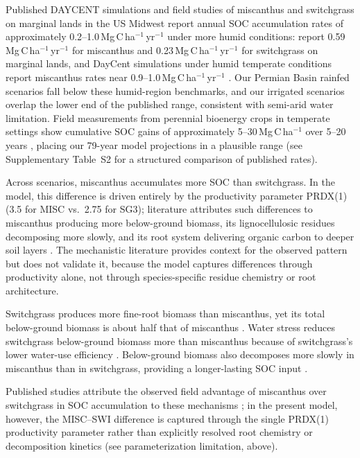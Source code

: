 \documentclass[11pt]{article}
\begin{document}
Published DAYCENT simulations and field studies of miscanthus and switchgrass on marginal lands in the US Midwest report annual SOC accumulation rates of approximately 0.2--1.0\,Mg\,C\,ha$^{-1}$\,yr$^{-1}$ under more humid conditions: \citet{Gelfand2013MarginalLands} report 0.59\,Mg\,C\,ha$^{-1}$\,yr$^{-1}$ for miscanthus and 0.23\,Mg\,C\,ha$^{-1}$\,yr$^{-1}$ for switchgrass on marginal lands, and DayCent simulations under humid temperate conditions report miscanthus rates near 0.9--1.0\,Mg\,C\,ha$^{-1}$\,yr$^{-1}$ \citep{Davis2010Comparative,Jarecki2020Placeholder}.
Our Permian Basin rainfed scenarios fall below these humid-region benchmarks, and our irrigated scenarios overlap the lower end of the published range, consistent with semi-arid water limitation. Field measurements from perennial bioenergy crops in temperate settings show cumulative SOC gains of approximately 5--30\,Mg\,C\,ha$^{-1}$ over 5--20 years \citep{AndersonTeixeira2009SOC,Gelfand2013MarginalLands}, placing our 79-year model projections in a plausible range (see Supplementary Table~S2 for a structured comparison of published rates).

Across scenarios, miscanthus accumulates more SOC than switchgrass. In the model, this difference is driven entirely by the productivity parameter PRDX(1) (3.5 for MISC vs.\ 2.75 for SG3); literature attributes such differences to miscanthus producing more below-ground biomass, its lignocellulosic residues decomposing more slowly, and its root system delivering organic carbon to deeper soil layers \citep{Gelfand2013MarginalLands,Davis2010Comparative,Fu2022MiscanthusSOC}. The mechanistic literature provides context for the observed pattern but does not validate it, because the model captures differences through productivity alone, not through species-specific residue chemistry or root architecture.

Switchgrass produces more fine-root biomass than miscanthus, yet its total below-ground biomass is about half that of miscanthus \citep{Chimento2015Placeholder,Martani2021Placeholder}. Water stress reduces switchgrass below-ground biomass more than miscanthus because of switchgrass's lower water-use efficiency \citep{VanLoocke2012WUE,Zeri2013WUE}. Below-ground biomass also decomposes more slowly in miscanthus than in switchgrass, providing a longer-lasting SOC input \citep{Fu2022MiscanthusSOC,Xu2024Placeholder}.

Published studies attribute the observed field advantage of miscanthus over switchgrass in SOC accumulation to these mechanisms \citep{Fu2022MiscanthusSOC}; in the present model, however, the MISC--SWI difference is captured through the single PRDX(1) productivity parameter rather than explicitly resolved root chemistry or decomposition kinetics (see parameterization limitation, above).
\end{document}
